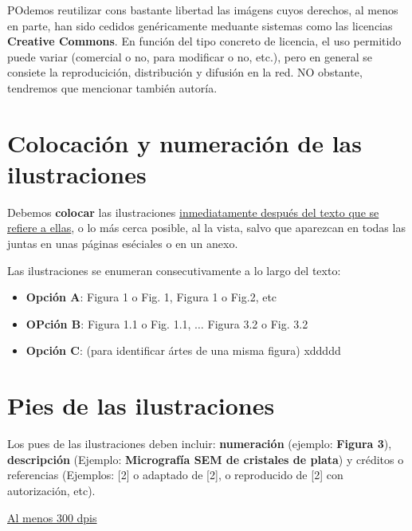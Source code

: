 \documentclass{article}
\begin{document}
POdemos reutilizar cons bastante libertad las imágens cuyos derechos, al menos en parte, han sido cedidos genéricamente meduante sistemas como las licencias \textcolor{Cinnabar}{\textbf{Creative Commons}}. En función del tipo concreto de licencia, el uso permitido puede variar (comercial o no, para modificar o no, etc.), pero en general se consiete la reproducición, distribución y difusión en la red. NO obstante, tendremos que mencionar también autoría. \vspace{0.5cm}

\section{ \textcolor{Cinnabar}{\textbf{Colocación y numeración de las ilustraciones}} } \vspace{0.5cm}

Debemos \textbf{colocar} las ilustraciones \underline{ inmediatamente después del texto que se refiere a ellas}, o lo más cerca posible, al la vista, salvo que aparezcan en todas las juntas en unas páginas eséciales o en un anexo. \vspace{0.5cm}

Las ilustraciones se enumeran consecutivamente a lo largo del texto: \vspace{0.5cm}


\begin{itemize}
	\item  \textbf{Opción A}: Figura 1 o Fig. 1, Figura 1 o Fig.2, etc
	\item \textbf{OPción B}: Figura 1.1 o Fig. 1.1, $\ldots$ Figura 3.2 o Fig. 3.2
	\item \textbf{Opción C}: (para identificar ártes de una misma figura)  xddddd
\end{itemize} \vspace{0.5cm}

\section{ \textcolor{Cinnabar}{ \textbf{Pies de las ilustraciones} } } \vspace{0.5cm}

Los pues de las ilustraciones deben incluir: \textbf{numeración} (ejemplo: \textbf{Figura 3}), \textbf{descripción} (Ejemplo: \textbf{Micrografía SEM de cristales de plata}) y créditos o referencias (Ejemplos: [2] o adaptado de [2], o reproducido de [2] con autorización, etc).

\underline{Al menos 300 dpis}
\end{document}
